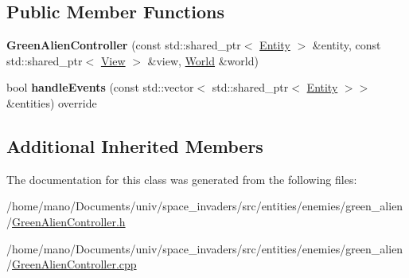 \subsection*{Public Member Functions}
\begin{DoxyCompactItemize}
\item 
\mbox{\label{classentities_1_1enemies_1_1green__alien_1_1GreenAlienController_af175899c90308195285ff3e7db10c9df}} 
{\bfseries Green\+Alien\+Controller} (const std\+::shared\+\_\+ptr$<$ \hyperlink{classentities_1_1Entity}{Entity} $>$ \&entity, const std\+::shared\+\_\+ptr$<$ \hyperlink{classentities_1_1View}{View} $>$ \&view, \hyperlink{classWorld}{World} \&world)
\item 
\mbox{\label{classentities_1_1enemies_1_1green__alien_1_1GreenAlienController_a63fb5ef2420687dd3dc37412a13f9c8e}} 
bool {\bfseries handle\+Events} (const std\+::vector$<$ std\+::shared\+\_\+ptr$<$ \hyperlink{classentities_1_1Entity}{Entity} $>$$>$ \&entities) override
\end{DoxyCompactItemize}
\subsection*{Additional Inherited Members}


The documentation for this class was generated from the following files\+:\begin{DoxyCompactItemize}
\item 
/home/mano/\+Documents/univ/space\+\_\+invaders/src/entities/enemies/green\+\_\+alien/\hyperlink{GreenAlienController_8h}{Green\+Alien\+Controller.\+h}\item 
/home/mano/\+Documents/univ/space\+\_\+invaders/src/entities/enemies/green\+\_\+alien/\hyperlink{GreenAlienController_8cpp}{Green\+Alien\+Controller.\+cpp}\end{DoxyCompactItemize}
